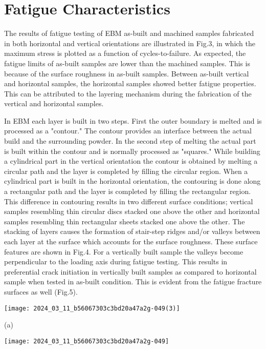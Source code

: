 \documentclass[10pt]{article}
\begin{document}
\section*{Fatigue Characteristics}
The results of fatigue testing of EBM as-built and machined samples fabricated in both horizontal and vertical orientations are illustrated in Fig.3, in which the maximum stress is plotted as a function of cycles-to-failure. As expected, the fatigue limits of as-built samples are lower than the machined samples. This is because of the surface roughness in as-built samples. Between as-built vertical and horizontal samples, the horizontal samples showed better fatigue properties. This can be attributed to the layering mechanism during the fabrication of the vertical and horizontal samples.

In EBM each layer is built in two steps. First the outer boundary is melted and is processed as a "contour." The contour provides an interface between the actual build and the surrounding powder. In the second step of melting the actual part is built within the contour and is normally processed as "squares." While building a cylindrical part in the vertical orientation the contour is obtained by melting a circular path and the layer is completed by filling the circular region. When a cylindrical part is built in the horizontal orientation, the contouring is done along a rectangular path and the layer is completed by filling the rectangular region. This difference in contouring results in two different surface conditions; vertical samples resembling thin circular discs stacked one above the other and horizontal samples resembling thin rectangular sheets stacked one above the other. The stacking of layers causes the formation of stair-step ridges and/or valleys between each layer at the surface which accounts for the surface roughness. These surface features are shown in Fig.4. For a vertically built sample the valleys become perpendicular to the loading axis during fatigue testing. This results in preferential crack initiation in vertically built samples as compared to horizontal sample when tested in as-built condition. This is evident from the fatigue fracture surfaces as well (Fig.5).

\begin{center}
\texttt{[image: 2024\_03\_11\_b56067303c3bd20a47a2g-049(3)]}
\end{center}

(a)

\begin{center}
\texttt{[image: 2024\_03\_11\_b56067303c3bd20a47a2g-049]}
\end{center}
\end{document}
